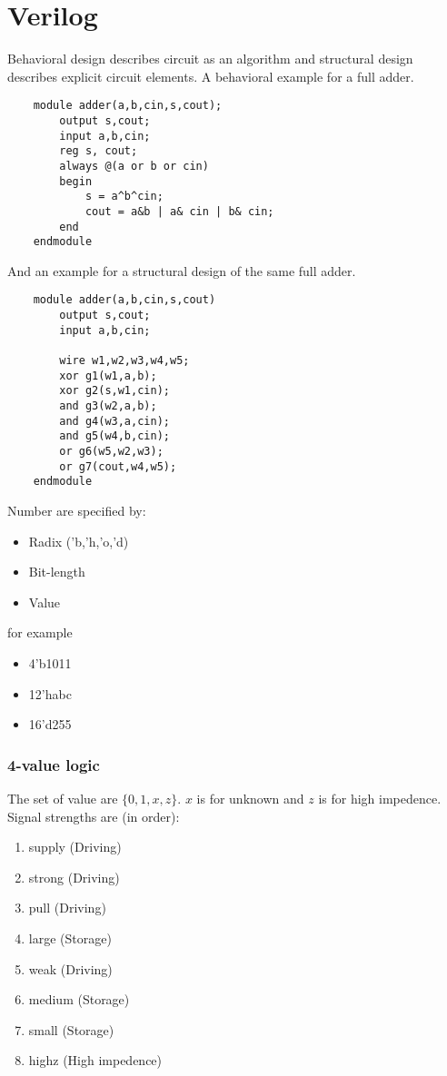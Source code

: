 \chapter{Verilog}
\lstset{language = Verilog}

Behavioral design describes circuit as an algorithm and structural design describes explicit circuit elements. A behavioral example for a full adder.
\begin{lstlisting}
    module adder(a,b,cin,s,cout);
        output s,cout;
        input a,b,cin;
        reg s, cout;
        always @(a or b or cin)
        begin
            s = a^b^cin;
            cout = a&b | a& cin | b& cin;
        end
    endmodule
\end{lstlisting}

And an example for a structural design of the same full adder.
\begin{lstlisting}
    module adder(a,b,cin,s,cout)
        output s,cout;
        input a,b,cin;

        wire w1,w2,w3,w4,w5;
        xor g1(w1,a,b);
        xor g2(s,w1,cin);
        and g3(w2,a,b);
        and g4(w3,a,cin);
        and g5(w4,b,cin);
        or g6(w5,w2,w3);
        or g7(cout,w4,w5);
    endmodule
\end{lstlisting}
Number are specified by:
\begin{itemize}
    \item Radix ('b,'h,'o,'d)
    \item Bit-length
    \item Value
\end{itemize}
for example
\begin{itemize}
    \item 4'b1011
    \item 12'habc
    \item 16'd255
\end{itemize}



\subsection{4-value logic}
The set of value are \(\{0,1,x,z\}\). \(x\) is for unknown and \(z\) is for high impedence.
Signal strengths are (in order):
\begin{enumerate}
    \item supply (Driving)
    \item strong (Driving)
    \item pull (Driving)
    \item large (Storage)
    \item weak (Driving)
    \item medium (Storage)
    \item small (Storage)
    \item highz (High impedence)
\end{enumerate}

